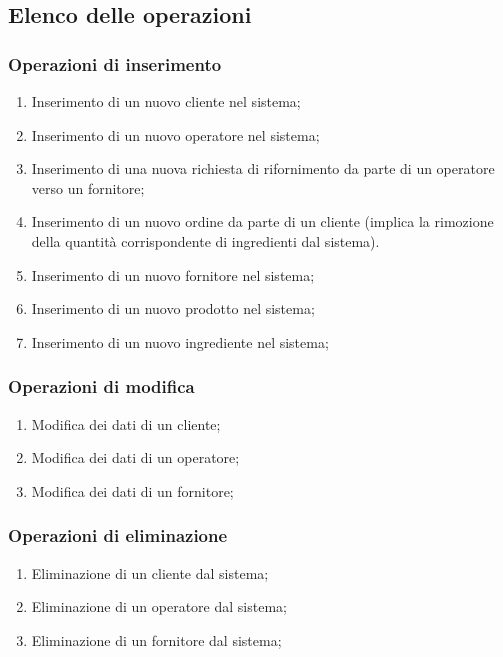 \documentclass[12pt,a4paper]{article}
\begin{document}
    \subsection{Elenco delle operazioni}
    \subsubsection{Operazioni di inserimento}
    \begin{enumerate}[leftmargin=2.8em,label=\textbf{Op.\arabic*}]
        \item Inserimento di un nuovo cliente nel sistema;
        \item Inserimento di un nuovo operatore nel sistema;
        \item Inserimento di una nuova richiesta di rifornimento da parte di un operatore verso un fornitore;
        \item Inserimento di un nuovo ordine da parte di un cliente (implica la rimozione della quantità corrispondente di ingredienti dal sistema).
        \item Inserimento di un nuovo fornitore nel sistema;
        \item Inserimento di un nuovo prodotto nel sistema;
        \item Inserimento di un nuovo ingrediente nel sistema;
    \end{enumerate}

    \subsubsection{Operazioni di modifica}
    \begin{enumerate}[leftmargin=2.8em,label=\textbf{Op.\arabic*}]
        \item Modifica dei dati di un cliente;
        \item Modifica dei dati di un operatore;
        \item Modifica dei dati di un fornitore;
    \end{enumerate}

    \subsubsection{Operazioni di eliminazione}
    \begin{enumerate}[leftmargin=2.8em,label=\textbf{Op.\arabic*}]
        \item Eliminazione di un cliente dal sistema;
        \item Eliminazione di un operatore dal sistema;
        \item Eliminazione di un fornitore dal sistema;
    \end{enumerate}
\end{document}
